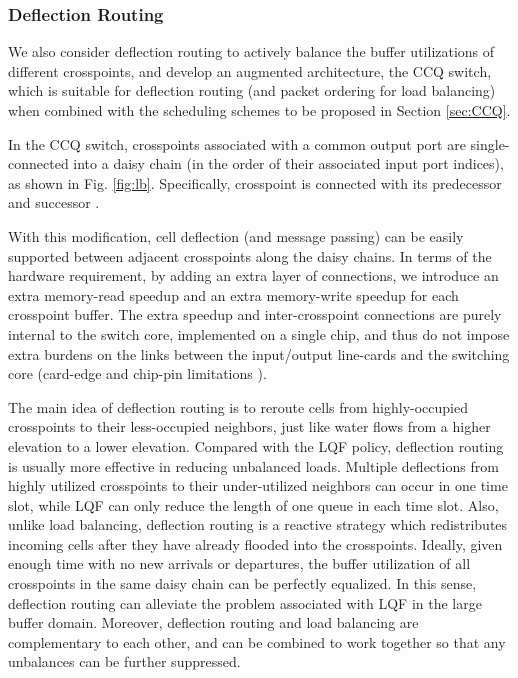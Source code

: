 \documentclass[journal,final,doublecolumn,10pt,twoside]{IEEEtranTCOM} \normalsize
\begin{document}
\subsubsection{Deflection Routing}
\label{sec:deflection}

We also consider deflection routing to actively balance the buffer utilizations of different crosspoints, and develop an augmented architecture, the CCQ switch, which is suitable for deflection routing (and packet ordering for load balancing) when combined with the scheduling schemes to be proposed in Section \ref{sec:CCQ}.

In the CCQ switch, crosspoints associated with a common output port are single-connected into a daisy chain (in the order of their associated input port indices), as shown in Fig. \ref{fig:lb}. Specifically, crosspoint  is connected with its predecessor  and successor .

With this modification, cell deflection (and message passing) can be easily supported between adjacent crosspoints along the daisy chains. In terms of the hardware requirement, by adding an extra layer of connections, we introduce an extra memory-read speedup and an extra memory-write speedup for each crosspoint buffer. The extra speedup and inter-crosspoint connections are purely internal to the switch core, implemented on a single chip, and thus do not impose extra burdens on the links between the input/output line-cards and the switching core (card-edge and chip-pin limitations \cite{asic03}).

The main idea of deflection routing is to reroute cells from highly-occupied crosspoints to their less-occupied neighbors, just like water flows from a higher elevation to a lower elevation. Compared with the LQF policy, deflection routing is usually more effective in reducing unbalanced loads. Multiple deflections from highly utilized crosspoints to their under-utilized neighbors can occur in one time slot, while LQF can only reduce the length of one queue in each time slot. Also, unlike load balancing, deflection routing is a reactive strategy which redistributes incoming cells after they have already flooded into the crosspoints. Ideally, given enough time with no new arrivals or departures, the buffer utilization of all crosspoints in the same daisy chain can be perfectly equalized. In this sense, deflection routing can alleviate the problem associated with LQF in the large buffer domain. Moreover, deflection routing and load balancing are complementary to each other, and can be combined to work together so that any unbalances can be further suppressed.
\end{document}
